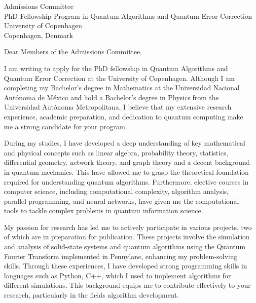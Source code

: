 \documentclass[a4paper,10pt]{letter}
\begin{document}
\begin{letter}{Admissions Committee\\
PhD Fellowship Program in Quantum Algorithms and Quantum Error Correction\\
University of Copenhagen\\
Copenhagen, Denmark}

\address{
Erick Jesús Ríos González\\
Toltecas 480, Ajusco, Coyoacán\\
Mexico City, 04300\\
\href{mailto:erickjesusriosgonzalez@gmail.com}{erickjesusriosgonzalez@gmail.com}\\
(+52) 951 587 1972\\
}

\opening{Dear Members of the Admissions Committee,}

I am writing to apply for the PhD fellowship in Quantum Algorithms and Quantum Error Correction at the University of Copenhagen. Although I am completing my Bachelor’s degree in Mathematics 
at the Universidad Nacional Autónoma de México and hold a Bachelor’s degree in Physics from the Universidad Autónoma Metropolitana, I believe that my extensive research experience, academic 
preparation, and dedication to quantum computing make me a strong candidate for your program.

During my studies, I have developed a deep understanding of key mathematical and physical concepts such as linear algebra, probability theory, statistics, differential geometry, network theory, 
and graph theory and a decent background in quantum mechanics. This have allowed me to grasp the theoretical foundation required for understanding quantum algorithms. Furthermore, elective 
courses in computer science, including computational complexity, algorithm analysis, parallel programming, and neural networks, have given me the computational tools 
to tackle complex problems in quantum information science.

My passion for research has led me to actively participate in various projects, two of which are in preparation for publication. These projects involve the simulation and analysis of solid-state systems and quantum algorithms
using the Quantum Fourier Transform implemented in Pennylane, enhancing my problem-solving skills. Through these experiences, I have developed strong programming skills in languages such as Python, C++, 
which I used to implement algorithms for different simulations. This background equips me to contribute effectively to your research, particularly in the fields algorithm development.


\end{letter}
\end{document}
